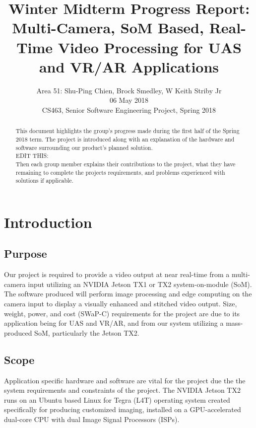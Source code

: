 \documentclass[letterpaper,10pt,serif,draftclsnofoot,onecolumn,compsoc,titlepage]{IEEEtran}
\title{Winter Midterm Progress Report: Multi-Camera, SoM Based, Real-Time Video Processing for UAS and VR/AR Applications}
\author{Area 51: Shu-Ping Chien, Brock Smedley, W Keith Striby Jr \\ 06 May 2018 \\ CS463, Senior Software Engineering Project, Spring 2018}
\begin{document}
\begin{titlepage}
\maketitle

\begin{abstract}

This document highlights the group's progress made during the first half of the 
Spring 2018 term. The project is introduced along with an explanation of the 
hardware and software surrounding our product's planned solution. \\

EDIT THIS:\\
Then each group member
explains their contributions to the project, what they have remaining to complete
the projects requirements, and problems experienced with solutions if applicable. \\


\thispagestyle{empty}
\end{abstract}
\end{titlepage}

\newpage
\tableofcontents

\newpage

\section{Introduction}

\subsection{Purpose}
Our project is required to provide a video output at near real-time from a 
multi-camera input utilizing an NVIDIA Jetson TX1 or TX2 system-on-module (SoM). 
The software produced will perform image processing and edge computing on the 
camera input to display a visually enhanced and stitched video output. 
Size, weight, power, and cost (SWaP-C) requirements for the project are due 
to its application being for UAS and VR/AR, and from our system utilizing a 
mass-produced SoM, particularly the Jetson TX2. \\

\subsection{Scope}

Application specific hardware and software are vital for the project due the the 
system requirements and constraints of the project.
The NVIDIA Jetson TX2 runs on an Ubuntu based Linux for Tegra (L4T) operating 
system created specifically for producing customized imaging, installed on a 
GPU-accelerated dual-core CPU with dual Image Signal Processors (ISPs). \\
\end{document}
